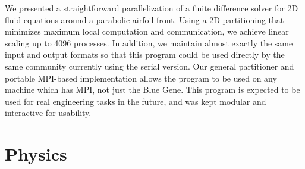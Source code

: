 \documentclass[twocolumn]{article}
\begin{document}
We presented a straightforward parallelization of a finite difference
solver for 2D fluid equations around a parabolic airfoil front.
Using a 2D partitioning that minimizes maximum local computation
and communication, we achieve linear scaling up to 4096 processes.
In addition, we maintain almost exactly the same input and output
formats so that this program could be used directly by the same
community currently using the serial version.
Our general partitioner and portable MPI-based implementation allows the program
to be used on any machine which has MPI, not just the Blue Gene.
This program is expected to be used for real engineering tasks
in the future, and was kept modular and interactive for usability.

\onecolumn
\section{Physics}
\label{sec:physics}


\begin{thebibliography}{9}

\end{thebibliography}
\end{document}
